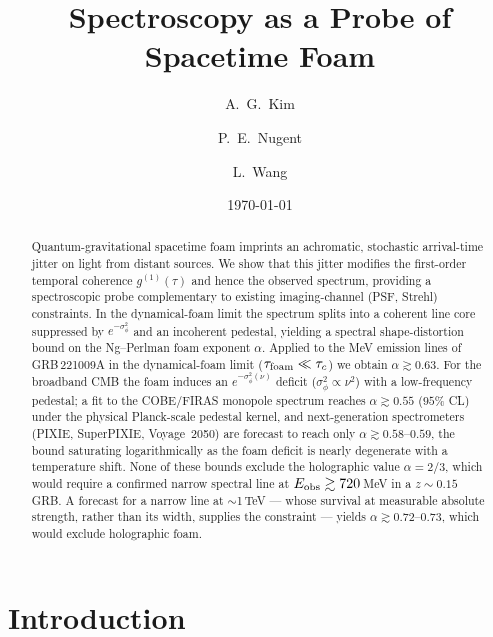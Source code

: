 \documentclass[aps,prd,onecolumn,amsmath,amssymb]{revtex4-2}
\begin{document}
\title{Spectroscopy as a Probe of Spacetime Foam}

\author{A.\ G.\ Kim}
\author{P.\ E.\ Nugent}
\author{L.\ Wang}

\date{\today}

\begin{abstract}
Quantum-gravitational spacetime foam imprints an achromatic, stochastic
arrival-time jitter on light from distant sources. We show that this jitter
modifies the first-order temporal coherence $g^{(1)}(\tau)$ and hence the
observed spectrum, providing a spectroscopic probe complementary to existing
imaging-channel (PSF, Strehl) constraints. In the
dynamical-foam limit the spectrum splits into a coherent line core suppressed
by $e^{-\sigma_\phi^2}$ and an incoherent pedestal, yielding a spectral
shape-distortion bound on the Ng--Perlman foam exponent $\alpha$.
Applied to the MeV emission lines of GRB\,221009A in the dynamical-foam
limit ($\tau_{\rm foam}\ll\tau_c$) we obtain $\alpha \gtrsim 0.63$.
For the broadband CMB the foam induces an $e^{-\sigma_\phi^2(\nu)}$ deficit
($\sigma_\phi^2 \propto \nu^2$) with a low-frequency pedestal; a fit to
the COBE/FIRAS monopole spectrum reaches $\alpha \gtrsim 0.55$
($95\%$ CL) under the physical Planck-scale pedestal
kernel, and next-generation spectrometers (PIXIE, SuperPIXIE,
Voyage~2050) are forecast to reach only $\alpha\gtrsim 0.58$--$0.59$,
the bound saturating logarithmically as the foam deficit is nearly
degenerate with a temperature shift. None of these bounds exclude
the holographic value $\alpha = 2/3$, which would require a confirmed
narrow spectral line at $E_{\rm obs} \gtrsim 720$\,MeV in a $z \sim 0.15$ GRB.
A forecast for a narrow line at $\sim$1\,TeV --- whose survival at
measurable absolute strength, rather than its width, supplies the
constraint --- yields $\alpha \gtrsim 0.72$--$0.73$, which would
exclude holographic foam.
\end{abstract}

\maketitle

\section{Introduction}
\label{sec:intro}
\end{document}
